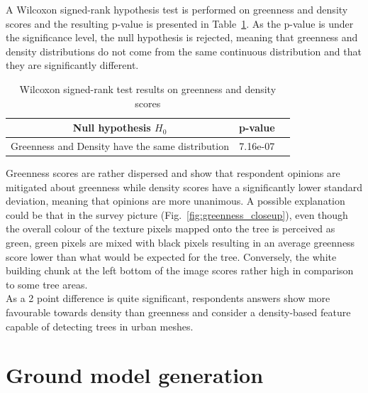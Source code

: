 \documentclass{kththesis}
\begin{document}
A Wilcoxon signed-rank hypothesis test is performed on greenness and density scores and the resulting p-value is presented in Table~\ref{table:green_dens}. As the p-value is under the significance level, the null hypothesis is rejected, meaning that greenness and density distributions do not come from the same continuous distribution and that they are significantly different.

\begin{table}[H]
\centering
\begin{tabular}{|c |c |c|}
\hline
Null hypothesis $H_0$ & p-value \\
\hline
Greenness and Density have the same distribution & 7.16e-07 \\
\hline
\end{tabular}
\caption{Wilcoxon signed-rank test results on greenness and density scores }
\label{table:green_dens}
\end{table}
Greenness scores are rather dispersed and show that respondent opinions are mitigated about greenness while density scores have a significantly lower standard deviation, meaning that opinions are more unanimous. 
 A possible explanation could be that in the survey picture (Fig.~\ref{fig:greenness_closeup}), even though the overall colour of the texture pixels mapped onto the tree is perceived as green, green pixels are mixed with black pixels resulting in an average greenness score lower than what would be expected for the tree. Conversely, the white building chunk at the left bottom of the image scores rather high in comparison to some tree areas. \\
As a 2 point difference is quite significant, respondents answers show more favourable towards density than greenness and consider a density-based feature capable of detecting trees in urban meshes. 

\section{Ground model generation}
\end{document}
